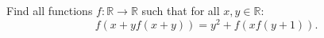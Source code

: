 Find all functions $f\colon\mathbb{R}\to\mathbb{R}$ such that for all $x,y\in\mathbb{R}$:
$$f(x+yf(x+y))=y^2+f(xf(y+1)).$$